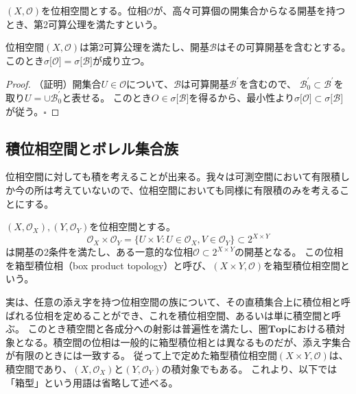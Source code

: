 \documentclass[../root.tex]{subfiles}
\begin{document}
\begin{Def}{}{}
$ ( X, \mathcal{O} ) $を位相空間とする。位相$ \mathcal{O} $が、高々可算個の開集合からなる開基を持つとき、第2可算公理を満たすという。
\end{Def}

\begin{Lem}{}{}
位相空間$ ( X, \mathcal{O} ) $は第2可算公理を満たし、開基$ \mathcal{B} $はその可算開基を含むとする。
このとき$ \sigma\lbrack \mathcal{O} \rbrack=\sigma\lbrack \mathcal{B} \rbrack $が成り立つ。
\end{Lem}

\begin{proof}
（証明）開集合$ U\in\mathcal{O} $について、$ \mathcal{B} $は可算開基$ \mathcal{B}^{\prime} $を含むので、
$ \mathcal{B}^{\prime}_{0}\subset\mathcal{B}^{\prime} $を取り$ U=\cup\mathcal{B}^{\prime}_{0} $と表せる。
このとき$ O\in\sigma\lbrack \mathcal{B} \rbrack $を得るから、最小性より$ \sigma\lbrack \mathcal{O} \rbrack\subset\sigma\lbrack \mathcal{B} \rbrack $が従う。$ \square $
\end{proof}




\subsection{積位相空間とボレル集合族}
位相空間に対しても積を考えることが出来る。我々は可測空間において有限積しか今の所は考えていないので、位相空間においても同様に有限積のみを考えることにする。

\begin{Def}{}{}
$ ( X, \mathcal{O}_{X} ), ( Y, \mathcal{O}_{Y} ) $を位相空間とする。
\[ \mathcal{O}_{X}\times\mathcal{O}_{Y}=\lbrace U\times V : U\in\mathcal{O}_{X}, V\in\mathcal{O}_{Y} \rbrace\subset 2^{X\times Y} \]
は開基の2条件を満たし、ある一意的な位相$ \mathcal{O}\subset 2^{X\times Y} $の開基となる。
この位相を箱型積位相（box product topology）と呼び、$ ( X\times Y, \mathcal{O} ) $を箱型積位相空間という。
\end{Def}

実は、任意の添え字を持つ位相空間の族について、その直積集合上に積位相と呼ばれる位相を定めることができ、これを積位相空間、あるいは単に積空間と呼ぶ。
このとき積空間と各成分への射影は普遍性を満たし、圏$ \mathbf{Top} $における積対象となる。積空間の位相は一般的に箱型積位相とは異なるものだが、添え字集合が有限のときには一致する。
従って上で定めた箱型積位相空間$ ( X\times Y, \mathcal{O} ) $は、積空間であり、$ ( X, \mathcal{O}_{X} ) $と$ ( Y, \mathcal{O}_{Y} ) $の積対象でもある。
これより、以下では「箱型」という用語は省略して述べる。
\end{document}
